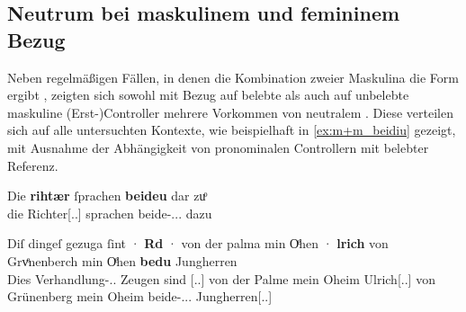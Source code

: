 \subsection{Neutrum bei maskulinem und femininem Bezug}
\label{subsec:m+m_anim_beidiu}

Neben regelmäßigen Fällen, in denen die Kombination zweier Maskulina die Form
 ergibt%
, zeigten sich sowohl mit Bezug auf belebte als auch auf unbelebte maskuline
(Erst-)Controller mehrere Vorkommen von neutralem . Diese
verteilen sich auf alle untersuchten Kontexte, wie beispielhaft in
\cref{ex:m+m_beidiu} gezeigt, mit Ausnahme der Abhängigkeit von pronominalen
Controllern mit belebter Referenz.

\begin{exe}
\ex \label{ex:m+m_beidiu}
	\begin{xlist}
	\ex \label{ex:m+m_beidiu_1}
		\gll Die \textbf{rihtær} ſprachen \textbf{beideu} {dar zuͦ} \\
			die Richter[\Nom.\Pl.\MascM] sprachen beide-\Nom.\Pl.\NeutM.\St{}
			dazu \\
		\begin{taggedline}{\parencites[\pno~28\ra, 8]{kc:B1}[vgl.~abweichend][10090]{schroeder1895}} %
		\trans {}
		\end{taggedline}


	\ex \label{ex:m+m_beidiu_3}
		\gll Diſ dingeſ gezuga ſint · \textbf{Rd} · von der palma
				min Oͤhen · \textbf{lrich} von Grvͤnenberch min Oͤhen
				\textbf{bedu} Jungherren %
				\textelp{} \\
			Dies Verhandlung-\Gen.\Sg.\NeutI{} Zeugen sind {}
				[\Nom.\Sg.\MascM] {} von der Palme mein Oheim {}
				Ulrich[\Nom.\Sg.\MascM] von Grünenberg mein Oheim
				beide-\Nom.\Pl.\NeutM.\St{} Jungherren[\Nom.\Pl.\MascM] %
				{} \\
		\begin{taggedline}{\parencites(Kl.~St.~Urban, Kt.~Luzern, 1298)[\pno~2915, 213.33--35]{cao4}}
		\trans {}
		\end{taggedline}


\end{xlist}
\end{exe}
